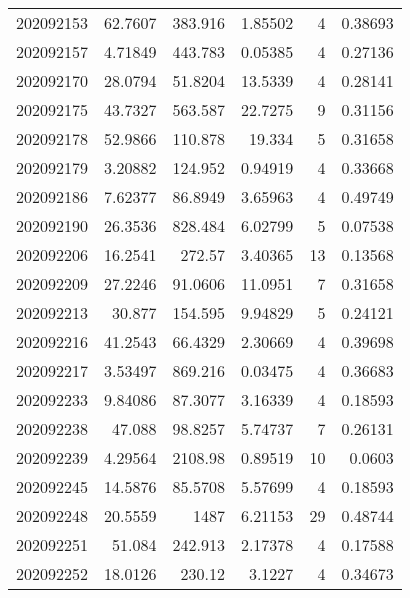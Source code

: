 \begin{tabular}{rrrrrr}
 202092153 &         62.7607  &      383.916  &            1.85502 &           4 & 0.38693 \\
 202092157 &          4.71849 &      443.783  &            0.05385 &           4 & 0.27136 \\
 202092170 &         28.0794  &       51.8204 &           13.5339  &           4 & 0.28141 \\
 202092175 &         43.7327  &      563.587  &           22.7275  &           9 & 0.31156 \\
 202092178 &         52.9866  &      110.878  &           19.334   &           5 & 0.31658 \\
 202092179 &          3.20882 &      124.952  &            0.94919 &           4 & 0.33668 \\
 202092186 &          7.62377 &       86.8949 &            3.65963 &           4 & 0.49749 \\
 202092190 &         26.3536  &      828.484  &            6.02799 &           5 & 0.07538 \\
 202092206 &         16.2541  &      272.57   &            3.40365 &          13 & 0.13568 \\
 202092209 &         27.2246  &       91.0606 &           11.0951  &           7 & 0.31658 \\
 202092213 &         30.877   &      154.595  &            9.94829 &           5 & 0.24121 \\
 202092216 &         41.2543  &       66.4329 &            2.30669 &           4 & 0.39698 \\
 202092217 &          3.53497 &      869.216  &            0.03475 &           4 & 0.36683 \\
 202092233 &          9.84086 &       87.3077 &            3.16339 &           4 & 0.18593 \\
 202092238 &         47.088   &       98.8257 &            5.74737 &           7 & 0.26131 \\
 202092239 &          4.29564 &     2108.98   &            0.89519 &          10 & 0.0603  \\
 202092245 &         14.5876  &       85.5708 &            5.57699 &           4 & 0.18593 \\
 202092248 &         20.5559  &     1487      &            6.21153 &          29 & 0.48744 \\
 202092251 &         51.084   &      242.913  &            2.17378 &           4 & 0.17588 \\
 202092252 &         18.0126  &      230.12   &            3.1227  &           4 & 0.34673 \\

\end{tabular}
